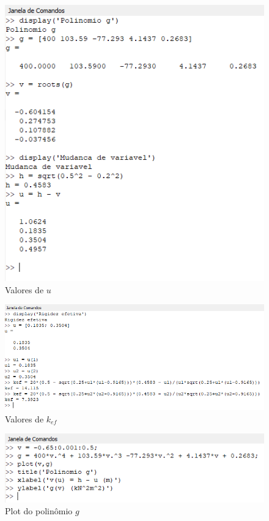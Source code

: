 \documentclass[a4paper, 12pt]{article}
\begin{document}
	\begin{figure}[!htb]
		\centering
		\includegraphics[scale=0.7]{img1.png}
		\caption{Valores de $u$}
	\end{figure}
	
	\begin{figure}[H]
		\centering
		\includegraphics[scale=0.7]{img2.png}
		\caption{Valores de $k_{ef}$}
	\end{figure}
	
	\begin{figure}[H]
		\centering
		\includegraphics[scale=0.7]{img3.png}
		\caption{Plot do polinômio $g$}
	\end{figure}
	
\end{document}
